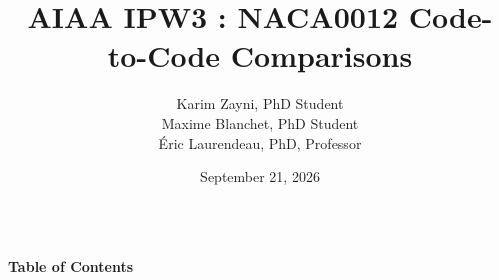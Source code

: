 \documentclass[10pt,aspectratio=169,xcolor={table,xcdraw}]{beamer}
\begin{document}
\title [IPW3 : NACA0012]{\large AIAA IPW3 : NACA0012 Code-to-Code Comparisons} 


\author[]{\small Karim Zayni, PhD Student \\ Maxime Blanchet, PhD Student \\ Éric Laurendeau, PhD, Professor}


\date{\small September 21, 2026}

\begin{frame}[plain]
\vspace{-0.5cm}
\begin{columns}
\titlepage
{}
\end{columns}
\end{frame}

\begin{frame}{\small \textbf{Table of Contents}}
\small
\tableofcontents
\end{frame}





%



\end{document}
